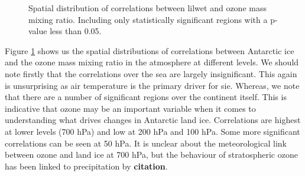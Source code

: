 \documentclass[../main.tex]{subfiles}
\begin{document}
\begin{figure}[hbt!]
\begin{subfigure}[b]{0.45\textwidth}
    \end{subfigure}
    \caption{Spatial distribution of correlations between \gls{lilwet} and ozone mass mixing ratio. Including only statistically significant regions with a p-value less than 0.05.}
    \label{fig:correlation_spatial_o3_50}
\end{figure}

Figure \ref{fig:correlation_spatial_o3_50} shows us the spatial distributions of correlations between Antarctic ice and the ozone mass mixing ratio in the atmosphere at different levels. We should note firstly that the correlations over the sea are largely insignificant. This again is unsurprising as air temperature is the primary driver for \gls{sie}. Whereas, we note that there are a number of significant regions over the continent itself. This is indicative that ozone may be an important variable when it comes to understanding what drives changes in Antarctic land ice. Correlations are highest at lower levels (700 hPa) and low at 200 hPa and 100 hPa. Some more significant correlations can be seen at 50 hPa. It is unclear about the meteorological link between ozone and land ice at 700 hPa, but the behaviour of stratospheric ozone has been linked to precipitation by \textbf{citation}.
\end{document}
